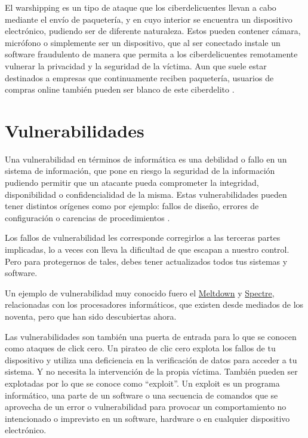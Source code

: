 \documentclass[
  spanish,
  a4paper,
  openany]{book}
\begin{document}
El warshipping es un tipo de ataque que los ciberdelicuentes llevan a cabo mediante el envío de paquetería, y en cuyo interior se encuentra un dispositivo electrónico, pudiendo ser de diferente naturaleza. Estos pueden contener cámara, micrófono o simplemente ser un dispositivo, que al ser conectado instale un software fraudulento de manera que permita a los ciberdelicuentes remotamente vulnerar la privacidad y la seguridad de la víctima. Aun que suele estar destinados a empresas que continuamente reciben paquetería, usuarios de compras online también pueden ser blanco de este ciberdelito \citep{INCI-warshipping}.

\hypertarget{vulnerabilidades}{%
\section{Vulnerabilidades}\label{vulnerabilidades}}

Una vulnerabilidad en términos de informática es una debilidad o fallo en un sistema de información, que pone en riesgo la seguridad de la información pudiendo permitir que un atacante pueda comprometer la integridad, disponibilidad o confidencialidad de la misma. Estas vulnerabilidades pueden tener distintos orígenes como por ejemplo: fallos de diseño, errores de configuración o carencias de procedimientos \citep{INCI-vulnerabilidad}.

Los fallos de vulnerabilidad les corresponde corregirlos a las terceras partes implicadas, lo a veces con lleva la dificultad de que escapan a nuestro control. Pero para protegernos de tales, debes tener actualizados todos tus sistemas y software.

Un ejemplo de vulnerabilidad muy conocido fuero el \href{https://es.wikipedia.org/wiki/Meltdown_(vulnerabilidad)}{Meltdown} y \href{https://es.wikipedia.org/wiki/Spectre_(vulnerabilidad)}{Spectre}, relacionadas con los procesadores informáticos, que existen desde mediados de los noventa, pero que han sido descubiertas ahora.

Las vulnerabilidades son también una puerta de entrada para lo que se conocen como ataques de click cero. Un pirateo de clic cero explota los fallos de tu dispositivo y utiliza una deficiencia en la verificación de datos para acceder a tu sistema. Y no necesita la intervención de la propia víctima. También pueden ser explotadas por lo que se conoce como ``exploit''. Un exploit es un programa informático, una parte de un software o una secuencia de comandos que se aprovecha de un error o vulnerabilidad para provocar un comportamiento no intencionado o imprevisto en un software, hardware o en cualquier dispositivo electrónico.
\end{document}
